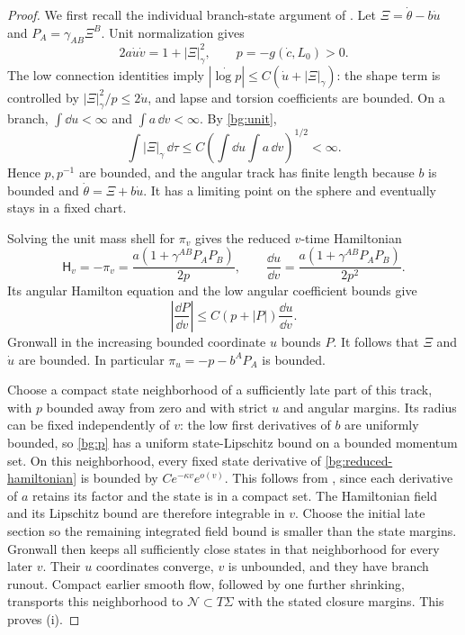 \begin{proof}
We first recall the individual branch-state argument of
\cite[, ]{KerrCOne}. Let
$\Xi=\dot\theta-b\dot u$ and $P_A=\gamma_{AB}\Xi^B$.
Unit normalization gives
\begin{equation}\label{bg:unit}
 2a\dot u\dot v=1+|\Xi|_\gamma^2,
 \qquad p=-g(\dot c,L_0)>0.
\end{equation}
The low connection identities imply
$|\dot{\log p}|\le C(\dot u+|\Xi|_\gamma)$:
the shape term is controlled by
$|\Xi|_\gamma^2/p\le2\dot u$, and lapse and torsion
coefficients are bounded. On a branch, $\int\dd u<\infty$
and $\int a\,\dd v<\infty$. By \eqref{bg:unit},
\[
 \int|\Xi|_\gamma\,\dd\tau
 \le C\left(\int\dd u\int a\,\dd v\right)^{1/2}<\infty.
\]
Hence $p,p^{-1}$ are bounded, and the angular track has finite
length because $b$ is bounded and
$\dot\theta=\Xi+b\dot u$. It has a limiting point on the
sphere and eventually stays in a fixed chart.

Solving the unit mass shell for $\pi_v$ gives the reduced
$v$-time Hamiltonian
\begin{equation}\label{bg:reduced-hamiltonian}
 \mathsf H_v=-\pi_v
  =\frac{a(1+\gamma^{AB}P_AP_B)}{2p},
 \qquad
 \frac{\dd u}{\dd v}
  =\frac{a(1+\gamma^{AB}P_AP_B)}{2p^2}.
\end{equation}
Its angular Hamilton equation and the low angular coefficient
bounds give
\[
 \left|\frac{\dd P}{\dd v}\right|
 \le C(p+|P|)\frac{\dd u}{\dd v}.
\]
Gronwall in the increasing bounded coordinate $u$ bounds $P$.
It follows that $\Xi$ and $\dot u$ are bounded. In particular
$\pi_u=-p-b^AP_A$ is bounded.

Choose a compact state neighborhood of a sufficiently late
part of this track, with $p$ bounded away from zero and with
strict $u$ and angular margins. Its radius can be fixed
independently of $v$: the low first derivatives of $b$ are
uniformly bounded, so \eqref{bg:p} has a uniform state-Lipschitz
bound on a bounded momentum set. On this neighborhood, every fixed state
derivative of \eqref{bg:reduced-hamiltonian} is bounded by
$Ce^{-\kappa v}e^{o(v)}$. This follows from
, since each derivative of $a$ retains
its factor and the state is in a compact set. The Hamiltonian
field and its Lipschitz bound are therefore integrable in $v$.
Choose the initial late section so the remaining integrated
field bound is smaller than the state margins. Gronwall then
keeps all sufficiently close states in that neighborhood for
every later $v$. Their $u$ coordinates converge, $v$ is
unbounded, and they have branch runout. Compact earlier smooth
flow, followed by one further shrinking, transports this
neighborhood to $\mathcal N\subset T\Sigma$ with the stated closure
margins. This proves \textup{(i)}.


\end{proof}
